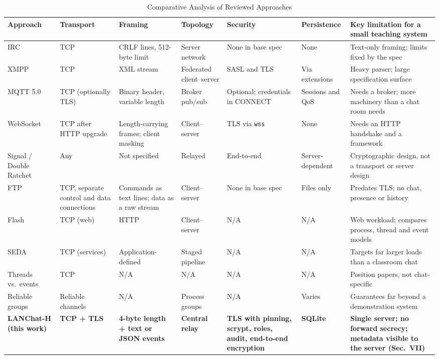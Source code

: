 \documentclass[conference]{IEEEtran}
\newcommand{\code}[1]{\texttt{#1}}
\begin{document}
\begin{table}[t]
\centering
\caption{Comparative Analysis of Reviewed Approaches}
\label{tab:comparison}
\scriptsize
\renewcommand{\arraystretch}{1.1}
\begin{tabularx}{\textwidth}{@{}>{\raggedright\arraybackslash}p{2.6cm} Y Y Y Y Y Y@{}}
\toprule
\textbf{Approach} & \textbf{Transport} & \textbf{Framing} & \textbf{Topology} & \textbf{Security} & \textbf{Persistence} & \textbf{Key limitation for a small teaching system} \\
\midrule
IRC \cite{rfc1459,rfc2812} & TCP & CRLF lines, 512-byte limit & Server network & None in base spec & None & Text-only framing; limits fixed by the spec \\
XMPP \cite{rfc6120,rfc6121} & TCP & XML stream & Federated client--server & SASL and TLS & Via extensions & Heavy parser; large specification surface \\
MQTT 5.0 \cite{mqtt5} & TCP (optionally TLS) & Binary header, variable length & Broker pub/sub & Optional; credentials in CONNECT & Sessions and QoS & Needs a broker; more machinery than a chat room needs \\
WebSocket \cite{rfc6455} & TCP after HTTP upgrade & Length-carrying frames; client masking & Client--server & TLS via \code{wss} & None & Needs an HTTP handshake and a framework \\
Signal / Double Ratchet \cite{signal,cohngordon} & Any & Not specified & Relayed & End-to-end & Server-dependent & Cryptographic design, not a transport or server design \\
FTP \cite{rfc959} & TCP, separate control and data connections & Commands as text lines; data as a raw stream & Client--server & None in base spec & Files only & Predates TLS; no chat, presence or history \\
Flash \cite{flash} & TCP (web) & HTTP & Client--server & N/A & N/A & Web workload; compares process, thread and event models \\
SEDA \cite{seda} & TCP (services) & Application-defined & Staged pipeline & N/A & N/A & Targets far larger loads than a classroom chat \\
Threads vs.\ events \cite{ousterhout,vonbehren,krohn} & TCP & N/A & N/A & N/A & N/A & Position papers, not chat-specific \\
Reliable groups \cite{birman87,birman93} & Reliable channels & N/A & Process groups & N/A & Varies & Guarantees far beyond a demonstration system \\
\textbf{LANChat-H (this work)} & \textbf{TCP + TLS} & \textbf{4-byte length + text or JSON events} & \textbf{Central relay} & \textbf{TLS with pinning, scrypt, roles, audit, end-to-end encryption} & \textbf{SQLite} & \textbf{Single server; no forward secrecy; metadata visible to the server (Sec.~VII)} \\
\bottomrule
\end{tabularx}
\end{table}
\end{document}

